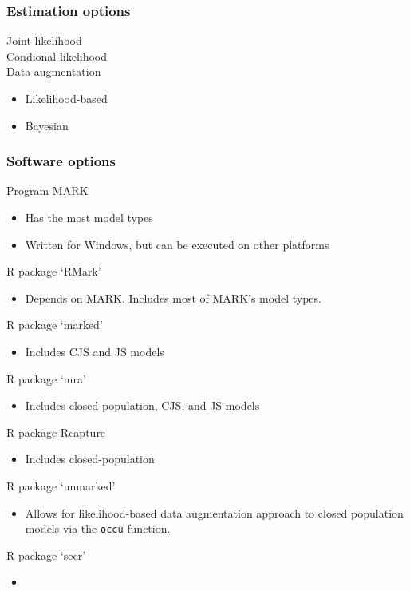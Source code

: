 \documentclass[color=usenames,dvipsnames]{beamer}\usepackage[]{graphicx}\usepackage[]{color}
\newcommand{\inr}[1]{\colorbox{inlinecolor}{\texttt{#1}}}
\begin{document}
\begin{frame}
  \frametitle{Estimation options}
  Joint likelihood \\
  Condional likelihood \\
  Data augmentation \\
  \begin{itemize}
    \item Likelihood-based
    \item Bayesian
  \end{itemize}
\end{frame}


\begin{frame}
  \frametitle{Software options}
  \small
  Program MARK
  \begin{itemize}
    \item Has the most model types
    \item Written for Windows, but can be executed on other platforms  
  \end{itemize}
  R package `RMark'
  \begin{itemize}
    \item Depends on MARK. Includes most of MARK's model types. 
  \end{itemize}
  R package `marked'
  \begin{itemize}
    \item Includes CJS and JS models
  \end{itemize}
  R package `mra'
  \begin{itemize}
    \item Includes closed-population, CJS, and JS models
  \end{itemize}
  R package Rcapture
  \begin{itemize}
    \item Includes closed-population
  \end{itemize}
  R package `unmarked'
  \begin{itemize}
    \item Allows for likelihood-based data augmentation approach to
      closed population models via the \inr{occu} function.  
  \end{itemize}
  R package `secr'
  \begin{itemize}
    \item 
  \end{itemize}
\end{frame}




\end{document}
